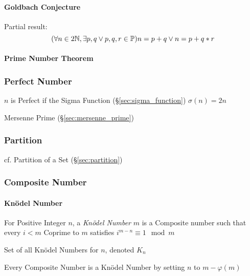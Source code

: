 \paragraph{Goldbach Conjecture}\label{sec:goldbach_conjecture}\hfill

Partial result:
\[
  (\forall n \in 2\mathbb{N}, \exists p,q \vee p,q,r \in \mathbb{P})
  n = p + q \vee n = p + q * r
\]



\paragraph{Prime Number Theorem}\label{sec:prime_number_theorem}\hfill



\subsubsection{Perfect Number}\label{sec:perfect_number}

$n$ is Perfect if the Sigma Function (\S\ref{sec:sigma_function})
$\sigma(n) = 2n$

Mersenne Prime (\S\ref{sec:mersenne_prime})



\subsubsection{Partition}\label{sec:integer_partition}

cf. Partition of a Set (\S\ref{sec:partition})



\subsubsection{Composite Number}\label{sec:composite_number}

\paragraph{Kn\"odel Number}\label{sec:knodel_number}\hfill

For Positive Integer $n$, a \emph{Kn\"odel Number} $m$ is a Composite
number such that every $i < m$ Coprime to $m$ satisfies $i^{m-n}
\equiv 1 \mod m$

Set of all Kn\"odel Numbers for $n$, denoted $K_n$

Every Composite Number is a Kn\"odel Number by setting $n$ to $m -
\varphi(m)$



